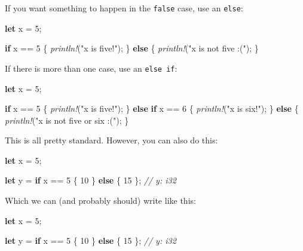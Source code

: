 \documentclass[a4paper,]{book}
\newenvironment{Shaded}{\begin{snugshade}}{\end{snugshade}}
\newcommand{\KeywordTok}[1]{\textcolor[rgb]{0.13,0.29,0.53}{\textbf{{#1}}}}
\newcommand{\DecValTok}[1]{\textcolor[rgb]{0.00,0.00,0.81}{{#1}}}
\newcommand{\StringTok}[1]{\textcolor[rgb]{0.31,0.60,0.02}{{#1}}}
\newcommand{\CommentTok}[1]{\textcolor[rgb]{0.56,0.35,0.01}{\textit{{#1}}}}
\newcommand{\PreprocessorTok}[1]{\textcolor[rgb]{0.56,0.35,0.01}{\textit{{#1}}}}
\newcommand{\NormalTok}[1]{{#1}}
\begin{document}
If you want something to happen in the \texttt{false} case, use an
\texttt{else}:

\begin{Shaded}
\begin{Highlighting}[]
\KeywordTok{let} \NormalTok{x = }\DecValTok{5}\NormalTok{;}

\KeywordTok{if} \NormalTok{x == }\DecValTok{5} \NormalTok{\{}
    \PreprocessorTok{println!}\NormalTok{(}\StringTok{"x is five!"}\NormalTok{);}
\NormalTok{\} }\KeywordTok{else} \NormalTok{\{}
    \PreprocessorTok{println!}\NormalTok{(}\StringTok{"x is not five :("}\NormalTok{);}
\NormalTok{\}}
\end{Highlighting}
\end{Shaded}

If there is more than one case, use an \texttt{else\ if}:

\begin{Shaded}
\begin{Highlighting}[]
\KeywordTok{let} \NormalTok{x = }\DecValTok{5}\NormalTok{;}

\KeywordTok{if} \NormalTok{x == }\DecValTok{5} \NormalTok{\{}
    \PreprocessorTok{println!}\NormalTok{(}\StringTok{"x is five!"}\NormalTok{);}
\NormalTok{\} }\KeywordTok{else} \KeywordTok{if} \NormalTok{x == }\DecValTok{6} \NormalTok{\{}
    \PreprocessorTok{println!}\NormalTok{(}\StringTok{"x is six!"}\NormalTok{);}
\NormalTok{\} }\KeywordTok{else} \NormalTok{\{}
    \PreprocessorTok{println!}\NormalTok{(}\StringTok{"x is not five or six :("}\NormalTok{);}
\NormalTok{\}}
\end{Highlighting}
\end{Shaded}

This is all pretty standard. However, you can also do this:

\begin{Shaded}
\begin{Highlighting}[]
\KeywordTok{let} \NormalTok{x = }\DecValTok{5}\NormalTok{;}

\KeywordTok{let} \NormalTok{y = }\KeywordTok{if} \NormalTok{x == }\DecValTok{5} \NormalTok{\{}
    \DecValTok{10}
\NormalTok{\} }\KeywordTok{else} \NormalTok{\{}
    \DecValTok{15}
\NormalTok{\}; }\CommentTok{// y: i32}
\end{Highlighting}
\end{Shaded}

Which we can (and probably should) write like this:

\begin{Shaded}
\begin{Highlighting}[]
\KeywordTok{let} \NormalTok{x = }\DecValTok{5}\NormalTok{;}

\KeywordTok{let} \NormalTok{y = }\KeywordTok{if} \NormalTok{x == }\DecValTok{5} \NormalTok{\{ }\DecValTok{10} \NormalTok{\} }\KeywordTok{else} \NormalTok{\{ }\DecValTok{15} \NormalTok{\}; }\CommentTok{// y: i32}
\end{Highlighting}
\end{Shaded}
\end{document}
